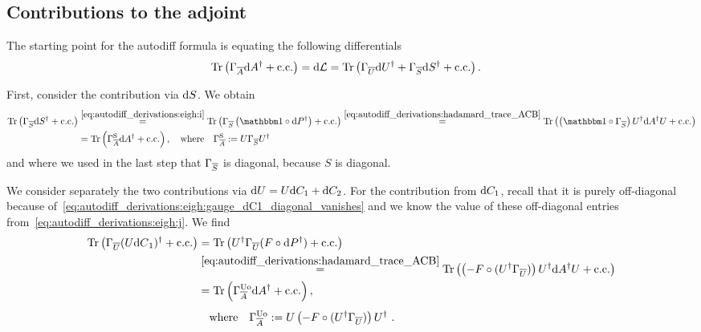 \subsection{Contributions to the adjoint}

The starting point for the autodiff formula is equating the following differentials
\begin{align}
    \label{eq:autodiff_derivations:starting_point}
    \tr{\Gconj{A} \d{A}^\dagger \pcc}
    &= \d{\mathcal{L}}
    = \tr{\Gconj{U} \d{U}^\dagger + \Gconj{S} \d{S}^\dagger \pcc}
    .
\end{align}

First, consider the contribution via $\mathrm{d}{S}$. We obtain
\begin{align}
    \begin{split}
        \tr{\Gconj{S} \d{S}^\dagger \pcc}
        &\overset{\eqref{eq:autodiff_derivations:eigh:i}}{=}
        \tr{\Gconj{S} \rBr{\eye\hadamard\dP^\dagger} \pcc}
        \overset{\eqref{eq:autodiff_derivations:hadamard_trace_ACB}}{=}
        \tr{\rBr{\eye\hadamard\Gconj{S}} U^\dagger \dA^\dagger U \pcc}
        \\
        &=
        \tr{\GcAs \dA^\dagger\pcc},
        \quad\text{where}\quad
        \GcAs := U \Gconj{S} U^\dagger
    \end{split}
\end{align}
and where we used in the last step that $\Gamma_{\overline{S}}$ is diagonal, because $S$ is diagonal.

We consider separately the two contributions via $\mathrm{d}{U} = U \mathrm{d}{C}_1 + \mathrm{d}{C}_2$.
%
For the contribution from $\mathrm{d}{C}_1$, recall that it is purely off-diagonal because of~\eqref{eq:autodiff_derivations:eigh:gauge_dC1_diagonal_vanishes} and we know the value of these off-diagonal entries from~\eqref{eq:autodiff_derivations:eigh:j}.
%
We find
\begin{align}
    \begin{split}
        \tr{\Gconj{U} (U \d{C}_1)^\dagger \pcc}
        &= \tr{U^\dagger \Gconj{U} (F \hadamard \dP^\dagger) \pcc}
        \\
        &\overset{\eqref{eq:autodiff_derivations:hadamard_trace_ACB}}{=}
        \tr{\rBr{-F \hadamard (U^\dagger \Gconj{U})} U^\dagger \dA^\dagger U \pcc}
        \\
        &= \tr{\GcAuo \dA^\dagger\pcc}
        ,
        \\[1ex]
        &\quad\text{where}\quad
        \GcAuo := U \rBr{-F \hadamard (U^\dagger \Gconj{U})} U^\dagger
        ~.
    \end{split}
\end{align}


